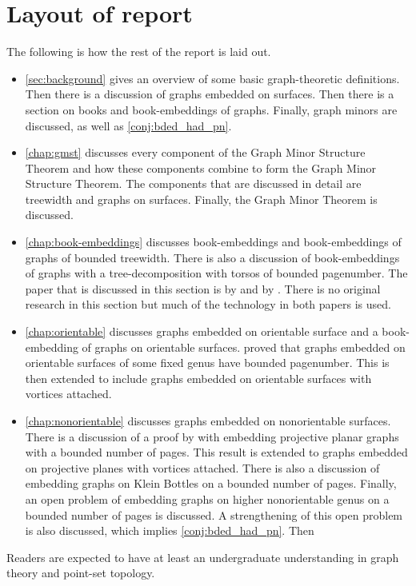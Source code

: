 \section{Layout of report}
The following is how the rest of the report is laid out. 
\begin{itemize}
	\item \cref{sec:background} gives an overview of some basic graph-theoretic definitions. Then there is a discussion of graphs embedded on surfaces. Then there is a section on books and book-embeddings of graphs. Finally, graph minors are discussed, as well as \cref{conj:bded_had_pn}. 
	\item \cref{chap:gmst} discusses every component of the Graph Minor Structure Theorem and how these components combine to form the Graph Minor Structure Theorem. The components that are discussed in detail are treewidth and graphs on surfaces. Finally, the Graph Minor Theorem is discussed.
	\item \cref{chap:book-embeddings} discusses book-embeddings and book-embeddings of graphs of bounded treewidth. There is also a discussion of book-embeddings of graphs with a tree-decomposition with torsos of bounded pagenumber. The paper that is discussed in this section is by \textcite{hickingbothamStackNumberCliqueSum2023} and by \textcite{ganleyPagenumberTrees2001}. There is no original research in this section but much of the technology in both papers is used. 
	\item \cref{chap:orientable} discusses graphs embedded on orientable surface and a book-embedding of graphs on orientable surfaces. \textcite{heathPagenumberGenusGraphs1992} proved that graphs embedded on orientable surfaces of some fixed genus have bounded pagenumber. This is then extended to include graphs embedded on orientable surfaces with vortices attached. 
	\item \cref{chap:nonorientable} discusses graphs embedded on nonorientable surfaces. There is a discussion of a proof by \textcite{nakamotoBookEmbeddingProjectiveplanar2015} with embedding projective planar graphs with a bounded number of pages. This result is extended to graphs embedded on projective planes with vortices attached. There is also a discussion of embedding graphs on Klein Bottles on a bounded number of pages. Finally, an open problem of embedding graphs on higher nonorientable genus on a bounded number of pages is discussed. A strengthening of this open problem is also discussed, which implies \cref{conj:bded_had_pn}. Then 
\end{itemize}

Readers are expected to have at least an undergraduate understanding in graph theory and point-set topology. 
